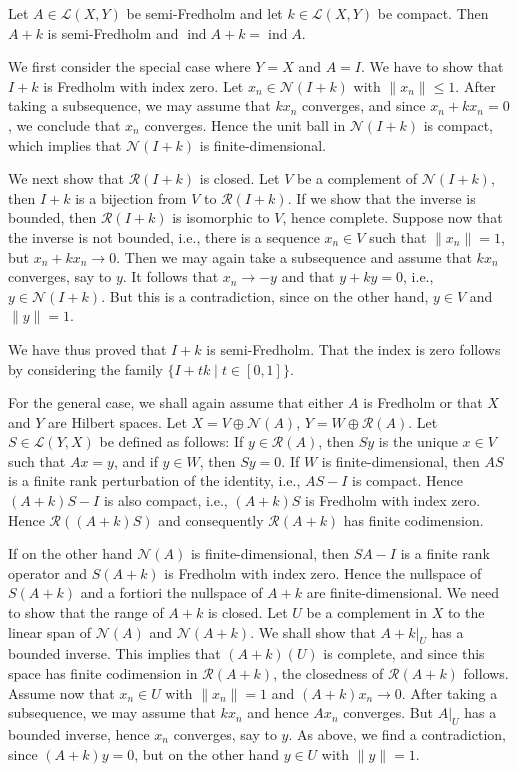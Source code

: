 \begin{Theorem}
\label{thm:compact-perturbation-fredholm-index-invariance}
Let $A\in\mathcal{L}(X,Y)$ be semi-Fredholm and let $k\in\mathcal{L}(X,Y)$ be compact. Then $A+k$ is semi-Fredholm and $\operatorname{ind}A+k=\operatorname{ind}A$.
\end{Theorem}

\begin{Proof}
We first consider the special case where $Y=X$ and $A=I$. We have to show that $I+k$ is Fredholm with index zero. Let $x_n\in\mathcal{N}(I+k)$ with $\|x_n\|\leq1$. After taking a subsequence, we may assume that $kx_n$ converges, and since $x_n+kx_n=0$, we conclude that $x_n$ converges. Hence the unit ball in $\mathcal{N}(I+k)$ is compact, which implies that $\mathcal{N}(I+k)$ is finite-dimensional.

We next show that $\mathcal{R}(I+k)$ is closed. Let $V$ be a complement of $\mathcal{N}(I+k)$, then $I+k$ is a bijection from $V$ to $\mathcal{R}(I+k)$. If we show that the inverse is bounded, then $\mathcal{R}(I+k)$ is isomorphic to $V$, hence complete. Suppose now that the inverse is not bounded, i.e., there is a sequence $x_n\in V$ such that $\|x_n\|=1$, but $x_n+kx_n\to0$. Then we may again take a subsequence and assume that $kx_n$ converges, say to $y$. It follows that $x_n\to-y$ and that $y+ky=0$, i.e., $y\in\mathcal{N}(I+k)$. But this is a contradiction, since on the other hand, $y\in V$ and $\|y\|=1$.

We have thus proved that $I+k$ is semi-Fredholm. That the index is zero follows by considering the family $\{I+tk\mid t\in[0,1]\}$.

For the general case, we shall again assume that either $A$ is Fredholm or that $X$ and $Y$ are Hilbert spaces. Let $X=V\oplus\mathcal{N}(A)$, $Y=W\oplus\mathcal{R}(A)$. Let $S\in\mathcal{L}(Y,X)$ be defined as follows: If $y\in\mathcal{R}(A)$, then $Sy$ is the unique $x\in V$ such that $Ax=y$, and if $y\in W$, then $Sy=0$. If $W$ is finite-dimensional, then $AS$ is a finite rank perturbation of the identity, i.e., $AS-I$ is compact. Hence $(A+k)S-I$ is also compact, i.e., $(A+k)S$ is Fredholm with index zero. Hence $\mathcal{R}((A+k)S)$ and consequently $\mathcal{R}(A+k)$ has finite codimension.

If on the other hand $\mathcal{N}(A)$ is finite-dimensional, then $SA-I$ is a finite rank operator and $S(A+k)$ is Fredholm with index zero. Hence the nullspace of $S(A+k)$ and a fortiori the nullspace of $A+k$ are finite-dimensional. We need to show that the range of $A+k$ is closed. Let $U$ be a complement in $X$ to the linear span of $\mathcal{N}(A)$ and $\mathcal{N}(A+k)$. We shall show that $A+k|_U$ has a bounded inverse. This implies that $(A+k)(U)$ is complete, and since this space has finite codimension in $\mathcal{R}(A+k)$, the closedness of $\mathcal{R}(A+k)$ follows. Assume now that $x_n\in U$ with $\|x_n\|=1$ and $(A+k)x_n\to0$. After taking a subsequence, we may assume that $kx_n$ and hence $Ax_n$ converges. But $A|_U$ has a bounded inverse, hence $x_n$ converges, say to $y$. As above, we find a contradiction, since $(A+k)y=0$, but on the other hand $y\in U$ with $\|y\|=1$.


\end{Proof}

